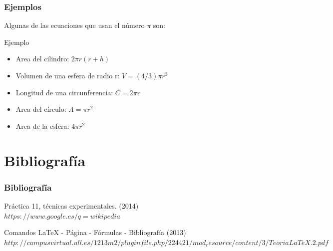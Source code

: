 \documentclass{beamer}
\begin{document}
\begin{frame}

\frametitle{Ejemplos}
Algunas de las ecuaciones que usan el número $\pi$ son:

\begin{block}{Ejemplo}
  \begin{itemize}
  \item
  Area del cilindro: $2\pi r(r+h)$
  \pause

  \item
  Volumen de una esfera de radio r: $V=(4/3)\pi r^3$
  \pause

  \item
   Longitud de una circunferencia: $C=2\pi r$
  \pause

  \item
  Area del círculo: $A=\pi r^2$
  \pause

  \item
   Area de la esfera: $4\pi r^2$
  \pause

  \end{itemize}
\end{block}

\end{frame}

\section{Bibliografía}

\begin{frame}
  \frametitle{Bibliografía}

  \begin{thebibliography}{10}

    \beamertemplatebookbibitems
     Práctica 11, técnicas experimentales. 
    (2014)
    {\small $https://www.google.es/q=wikipedia$} 

    \beamertemplatebookbibitems
    Comandos LaTeX - Página - Fórmulas - Bibliografía 
    (2013) 
    {\small $http://campusvirtual.ull.es/1213m2/pluginfile.php/224421/mod_resource/content/3/TeoriaLaTeX.2.pdf$}

  \end{thebibliography}
\end{frame}
\end{document}
